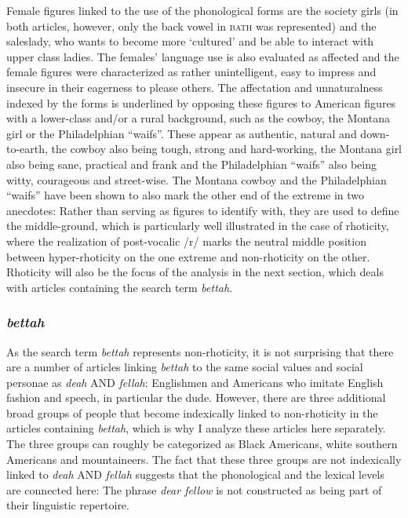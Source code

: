 Female figures linked to the use of the phonological forms are the society girls (in both articles, however, only the back vowel in \textsc{bath} was represented) and the saleslady, who wants to become more ‘cultured’ and be able to interact with upper class ladies. The females’ language use is also evaluated as affected and the female figures were characterized as rather unintelligent, easy to impress and insecure in their eagerness to please others. The affectation and unnaturalness indexed by the forms is underlined by opposing these figures to American figures with a lower-class and/or a rural background, such as the cowboy, the Montana girl or the Philadelphian “waifs”. These appear as authentic, natural and down-to-earth, the cowboy also being tough, strong and hard-working, the Montana girl also being sane, practical and frank and the Philadelphian “waifs” also being witty, courageous and street-wise. The Montana cowboy and the Philadelphian “waifs” have been shown to also mark the other end of the extreme in two anecdotes: Rather than serving as figures to identify with, they are used to define the middle-ground, which is particularly well illustrated in the case of rhoticity, where the realization of post-vocalic /r/ marks the neutral middle position between hyper-rhoticity on the one extreme and non-rhoticity on the other. Rhoticity will also be the focus of the analysis in the next section, which deals with articles containing the search term \emph{bettah}.

\subsubsection{\emph{bettah}}
\hypertarget{Toc63021238}{}
As the search term \emph{bettah} represents non-rhoticity, it is not surprising that there are a number of articles linking \emph{bettah} to the same social values and social personae as \emph{deah} AND \emph{fellah}: Englishmen and Americans who imitate English fashion and speech, in particular the dude. However, there are three additional broad groups of people that become indexically linked to non-rhoticity in the articles containing \emph{bettah}, which is why I analyze these articles here separately. The three groups can roughly be categorized as Black Americans, white southern Americans and mountaineers. The fact that these three groups are not indexically linked to \emph{deah} AND \emph{fellah} suggests that the phonological and the lexical levels are connected here: The phrase \emph{dear fellow} is not constructed as being part of their linguistic repertoire.


